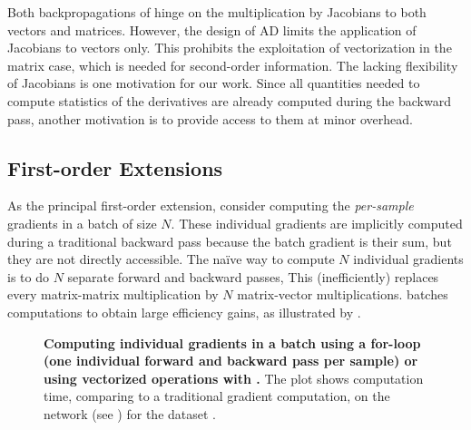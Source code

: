 Both backpropagations of
 hinge on the
multiplication by Jacobians to both vectors and matrices. However, the design of
AD limits the application of Jacobians to vectors only. This prohibits the
exploitation of vectorization in the matrix case, which is needed for
second-order information. The lacking flexibility of Jacobians is one motivation
for our work. Since all quantities needed to compute statistics of the
derivatives are already computed during the backward pass, another motivation is
to provide access to them at minor overhead.

\subsection{First-order Extensions}
As the principal first-order extension, consider computing the \emph{per-sample}
gradients in a batch of size $N$. These individual gradients are implicitly
computed during a traditional backward pass because the batch gradient is their
sum, but they are not directly accessible. The naïve way to compute $N$
individual gradients is to do $N$ separate forward and backward passes, This
(inefficiently) replaces every matrix-matrix multiplication by $N$ matrix-vector
multiplications. \BackPACK batches computations to obtain large efficiency
gains, as illustrated by
.

\begin{figure}
  \centering
  
  \tikzexternalenable%
  
  \tikzexternaldisable%
  \caption{\textbf{Computing individual gradients in a batch using a for-loop
      (\ie one individual forward and backward pass per sample) or using
      vectorized operations with \BackPACK.} The plot shows computation time,
    comparing to a traditional gradient computation, on the \CIFARTENNET%
    network (see ) for the \CIFARTEN%
    dataset \citep{schneider2019deepobs}.
  }\label{backpack::fig:bench-individual-gradients}
\end{figure}

